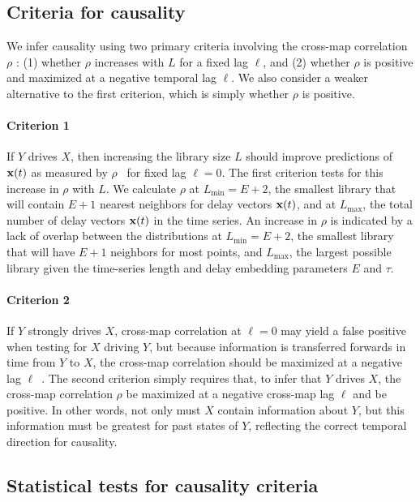 \subsection*{Criteria for causality}

We infer causality using two primary criteria involving the cross-map correlation $\rho$ \cite{Sugihara2012, Ye2015}: (1) whether $\rho$ increases with $L$ for a fixed lag $\ell$, and (2) whether $\rho$ is positive and maximized at a negative temporal lag $\ell$. 
We also consider a weaker alternative to the first criterion, which is simply whether $\rho$ is positive.

\paragraph{Criterion 1}
If $Y$ drives $X$, then increasing the library size $L$ should improve predictions of $\mathbf{x}(t)$ as measured by $\rho$~\cite{Sugihara2012} for fixed lag $\ell = 0$.
The first criterion tests for this increase in $\rho$ with $L$.
We calculate $\rho$ at $L_{\min} = E + 2$, the smallest library that will contain $E + 1$ nearest neighbors for delay vectors $\mathbf{x}(t)$, and at $L_{\max}$, the total number of delay vectors $\mathbf{x}(t)$ in the time series.
An increase in $\rho$ is indicated by a lack of overlap between the distributions at $L_{\min} = E + 2$, the smallest library that will have $E + 1$ neighbors for most points, and $L_{\max}$, the largest possible library given the time-series length and delay embedding parameters $E$ and $\tau$.

\paragraph{Criterion 2}
If $Y$ strongly drives $X$, cross-map correlation at $\ell = 0$ may yield a false positive when testing for $X$ driving $Y$, but because information is transferred forwards in time from $Y$ to $X$, the cross-map correlation should be maximized at a negative lag $\ell$~\cite{Ye2015}.
The second criterion simply requires that, to infer that $Y$ drives $X$, the cross-map correlation $\rho$ be maximized at a negative cross-map lag $\ell$ and be positive.
In other words, not only must $X$ contain information about $Y$, but this information must be greatest for past states of $Y$, reflecting the correct temporal direction for causality.


\subsection*{Statistical tests for causality criteria}

